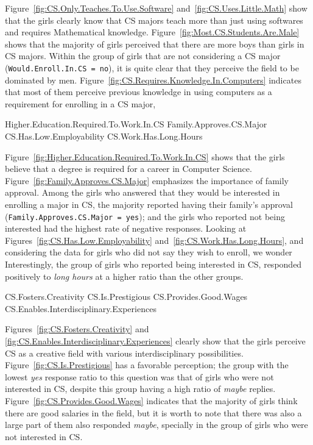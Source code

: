Figure~\ref{fig:CS.Only.Teaches.To.Use.Software} and~\ref{fig:CS.Uses.Little.Math} show that the girls clearly know that CS majors teach more than just using softwares and requires Mathematical knowledge. Figure~\ref{fig:Most.CS.Students.Are.Male} shows that the majority of girls perceived that there are more boys than girls in CS majors. Within the group of girls that are not considering a CS major (\texttt{Would.Enroll.In.CS = no}), it is quite clear that they perceive the field to be dominated by men.  Figure~\ref{fig:CS.Requires.Knowledge.In.Computers} indicates that most of them perceive previous knowledge in using computers as a requirement for enrolling in a CS major, 

    {Higher.Education.Required.To.Work.In.CS}
    {Family.Approves.CS.Major}
    {CS.Has.Low.Employability}
    {CS.Work.Has.Long.Hours}%

Figure~\ref{fig:Higher.Education.Required.To.Work.In.CS} shows that the girls believe that a degree is required for a career in Computer Science. Figure~\ref{fig:Family.Approves.CS.Major} emphasizes the importance of family approval. Among the girls who answered that they would be interested in enrolling a major in CS, the majority reported having their family's approval (\texttt{Family.Approves.CS.Major = yes}); and the girls who reported not being interested had the highest rate of negative responses. Looking at Figures~\ref{fig:CS.Has.Low.Employability} and~\ref{fig:CS.Work.Has.Long.Hours}, and considering the data for girls who did not say they wish to enroll, we wonder 
Interestingly, the group of girls who reported being interested in CS, responded positively to \emph{long hours} at a higher ratio than the other groups.

    {CS.Fosters.Creativity}
    {CS.Is.Prestigious}
    {CS.Provides.Good.Wages}
    {CS.Enables.Interdisciplinary.Experiences}%

Figures~\ref{fig:CS.Fosters.Creativity} and \ref{fig:CS.Enables.Interdisciplinary.Experiences} clearly show that the girls perceive CS as a creative field with various interdisciplinary possibilities. Figure~\ref{fig:CS.Is.Prestigious} has a favorable perception; the group with the lowest \emph{yes} response ratio to this question was that of girls who were not interested in CS, despite this group having a high ratio of \emph{maybe} replies. Figure~\ref{fig:CS.Provides.Good.Wages} indicates that the majority of girls think there are good salaries in the field, but it is worth to note that there was also a large part of them also responded \emph{maybe}, specially in the group of girls who were not interested in CS.

